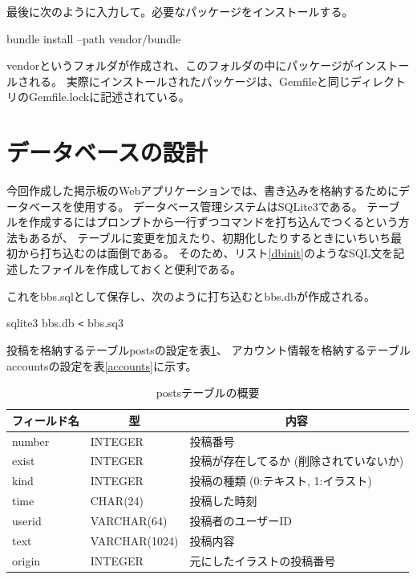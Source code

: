 \documentclass[a4j,titlepage]{jsarticle}
\newcommand{\chuo}[1]{\multicolumn{1}{|c|}{#1}}
\begin{document}
最後に次のように入力して。必要なパッケージをインストールする。

\begin{mdframed}
  bundle install --path vendor/bundle
\end{mdframed}

vendorというフォルダが作成され、このフォルダの中にパッケージがインストールされる。
実際にインストールされたパッケージは、Gemfileと同じディレクトリのGemfile.lockに記述されている。


\section{データベースの設計}
今回作成した掲示板のWebアプリケーションでは、書き込みを格納するためにデータベースを使用する。
データベース管理システムはSQLite3である。
テーブルを作成するにはプロンプトから一行ずつコマンドを打ち込んでつくるという方法もあるが、
テーブルに変更を加えたり、初期化したりするときにいちいち最初から打ち込むのは面倒である。
そのため、リスト\ref{dbinit}のようなSQL文を記述したファイルを作成しておくと便利である。



これをbbs.sqlとして保存し、次のように打ち込むとbbs.dbが作成される。

\begin{mdframed}
  sqlite3 bbs.db \verb|<| bbs.sq3
\end{mdframed}

投稿を格納するテーブルpostsの設定を表\ref{writings}、
アカウント情報を格納するテーブルaccountsの設定を表\ref{accounts}に示す。

\begin{table}[h]
  \centering
  \caption{postsテーブルの概要}
  \label{writings}
  \begin{tabular}{|l|l|l|}
    \hline
    \chuo{フィールド名} & \chuo{型} & \chuo{内容} \\ \hline \hline
    number & INTEGER & 投稿番号 \\ \hline
    exist  & INTEGER & 投稿が存在してるか (削除されていないか) \\ \hline
    kind   & INTEGER & 投稿の種類 (0:テキスト, 1:イラスト) \\ \hline
    time   & CHAR(24) & 投稿した時刻     \\ \hline
    userid & VARCHAR(64) & 投稿者のユーザーID \\ \hline
    text   & VARCHAR(1024) & 投稿内容   \\ \hline
    origin & INTEGER & 元にしたイラストの投稿番号  \\ \hline
  \end{tabular}
\end{table}
\end{document}
